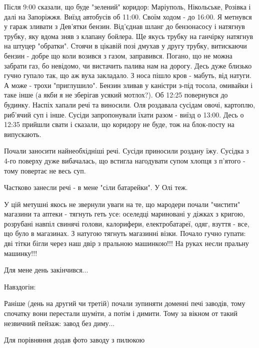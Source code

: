 Після 9:00 сказали, що буде "зелений" коридор: Маріуполь, Нікольське, Розівка і
далі на Запоріжжя. Виїзд автобусів об 11:00. Своїм ходом - до 16:00. Я метнувся
у гараж зливати з Дев'ятки бензин. Від'єднав шланг до бензонасосу і натягнув
трубку, яку вдома зняв з клапану бойлера. Ще якусь трубку на ганчірку натягнув
на штуцер "обратки". Стоячи в цікавій позі дмухав у другу трубку, витискаючи
бензин - добре що коли возився з газом, заправився. Погано, що не можна забрати
газ, бо невідомо, чи вистачить  палива нам на дорогу. Десь дуже близько гучно
гупало так, що аж вуха закладало. З носа пішло кров - мабуть, від натуги. А
може - трохи "приглушило". Бензин зливав у каністри з-під тосола, омивайки і
таке інше (а якби я не зберігав усякий мотлох?). Об 12:25 повернувся до
будинку. Наспіх хапали речі та виносили. Оля роздавала сусідам овочі, картоплю,
риб'ячий суп і інше.  Сусіди запропонували їхати разом - виїзд о 13:00. Десь о
12:35 прийшли свати і сказали, що коридору не буде, тож на блок-посту на
випускають.

Почали заносити найнеобхідніші речі. Сусіди приносили роздану їжу. Сусідка з
4-го поверху дуже вибачалась, що встигла нагодувати супом хлопця з п'ятого -
тому повертає не весь суп.


Частково занесли речі - в мене "сіли батарейки". У Олі теж.

У цій метушні якось не звернули уваги на те,  що мародери почали "чистити"
магазини та аптеки - тягнуть геть усе: оселедці мариновані у діжках з кригою,
розрубані навпіл свинячі голови, калорифери, електробатареї, одяг, взуття -
все, що було в магазинах. З натугою тягнуть магазинні візки. Почало гучно
гупати: дві тітки бігли через наш двір з пральною машинкою!!! На руках несли
пральну машинку!!!

Для мене день закінчився...

Навздогін:

Раніше (день на другий чи третій) почали зупиняти доменні печі заводів, тому
спочатку вони перестали шуміти, а потім і димити. Тому за вікном от такий
незвичний пейзаж: завод без диму...

Для порівняння додав фото заводу з пилюкою

